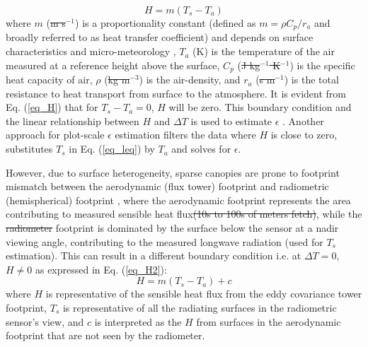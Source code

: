 \documentclass[fleqn,10pt]{wlscirep}
\providecommand{\DIFaddtex}[1]{{\protect\color{blue}\uwave{#1}}} %
\providecommand{\DIFdeltex}[1]{{\protect\color{red}\sout{#1}}}                      %
\providecommand{\DIFaddbegin}{} %
\providecommand{\DIFaddend}{} %
\providecommand{\DIFdelbegin}{} %
\providecommand{\DIFdelend}{} %
\providecommand{\DIFadd}[1]{\texorpdfstring{\DIFaddtex{#1}}{#1}} %
\providecommand{\DIFdel}[1]{\texorpdfstring{\DIFdeltex{#1}}{}} %
\begin{document}
\DIFdelend \DIFaddbegin \DIFadd{:
}\DIFaddend \begin{equation}\label{eq_H}
H= m(T_{s} - T_{a})
\end{equation}
where  $m$ (\DIFdelbegin \DIFdel{m s$^{-1}$}\DIFdelend \DIFaddbegin \DIFadd{$ms^{-1}$}\DIFaddend ) is a proportionality constant (defined as $m=\rho C_{p}/r_{a}$ and broadly referred to as heat transfer coefficient) and depends on surface characteristics and micro-meteorology \cite{lhomme1988radiative}, $T_{a}$ (K) is the temperature of the air measured at a reference height above the surface, $C_{p}$ (\DIFdelbegin \DIFdel{J kg$^{-1}$ K$^{-1}$}\DIFdelend \DIFaddbegin \DIFadd{$Jkg^{-1}$ $K^{-1}$}\DIFaddend ) is the specific heat capacity of air, $\rho$ (\DIFdelbegin \DIFdel{kg m$^{-3}$}\DIFdelend \DIFaddbegin \DIFadd{$kgm^{-3}$}\DIFaddend ) is the air-density, and $r_{a}$ (\DIFdelbegin \DIFdel{s m$^{-1}$}\DIFdelend \DIFaddbegin \DIFadd{$sm^{-1}$}\DIFaddend ) is the total resistance to heat transport from surface to the atmosphere. It is evident from Eq. (\ref{eq_H}) that for $T_{s} - T_{a} = 0$, $H$ will be zero. This boundary condition and the linear relationship  between $H$ and $\Delta T $ is used to estimate $\epsilon$ \cite{holmes2009land,holmes2016cloud}. Another approach for plot-scale $\epsilon$ estimation filters the data where $H$ is close to zero, substitutes $T_{s}$ in Eq. (\ref{eq_leq}) by $T_{a}$ and solves for $\epsilon$\cite{maes2019potential}. 

However, due to surface heterogeneity, sparse canopies are prone to footprint mismatch between the aerodynamic (flux tower) footprint and radiometric (hemispherical) footprint \cite{chu2021representativeness,marcolla2018geometry,morillas2013using}, where the aerodynamic footprint represents the area contributing to measured sensible heat flux\DIFdelbegin \DIFdel{(10s to 100s of meters fetch)}\DIFdelend , while the \DIFdelbegin \DIFdel{radiometer }\DIFdelend \DIFaddbegin \DIFadd{radiometric }\DIFaddend footprint is dominated by the surface below the sensor at a nadir viewing angle, contributing to the measured longwave radiation (used for $T_{s}$ estimation). This can result in a different boundary condition i.e. at $\Delta T =0$, $H \not= 0$ as expressed in Eq. (\ref{eq_H2}): 
\begin{equation}\label{eq_H2}
H= m(T_{s} - T_{a}) +  c    
\end{equation}
where $H$ is representative of the sensible heat flux from the eddy covariance tower footprint, $T_{s}$ is representative of all the radiating surfaces in the radiometric sensor’s view, and $c$ is interpreted as the $H$ from surfaces in the aerodynamic footprint that are not seen by the radiometer. 
\end{document}
